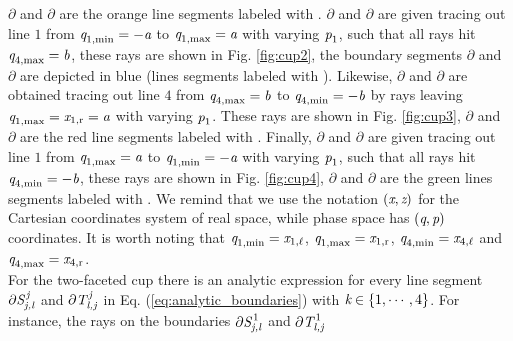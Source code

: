  $\partial$ and $\partial$ are the orange line segments labeled with . 
 $\partial$ and $\partial$ are given tracing out line $1$ from
 $\textit{q}_{1, \textrm{min}}= -\textit{a}$ to $\textit{q}_{1, \textrm{max}}= \textit{a}$
 with varying $\textit{p}_1$, such that all rays hit $\textit{q}_{4, \textrm{max}} = \textit{b}$, these rays are shown in Fig. \ref{fig:cup2}, the boundary segments
 $\partial$ and $\partial$ are depicted in blue (lines segments labeled with ).
 Likewise, $\partial$ and $\partial$ are obtained tracing out line $4$ from
$\textit{q}_{4, \textrm{max}}= \textit{b}$ to $\textit{q}_{4, \textrm{min}}= -\textit{b}$ 
 by rays leaving $\textit{q}_{1, \textrm{max}}=\textit{x}_{1, \textrm{r}} = \textit{a}$ with varying $\textit{p}_{1}$. These rays are shown in Fig. \ref{fig:cup3}, 
 $\partial$ and $\partial$ are the red line segments labeled with .
  Finally, $\partial$ and $\partial$ are given tracing out line $1$ from
$\textit{q}_{1, \textrm{max}} = \textit{a}$ to  $\textit{q}_{1, \textrm{min}} = -\textit{a}$ 
 with varying $\textit{p}_{1}$, such that all rays hit $\textit{q}_{4, \textrm{min}} = -\textit{b}$, these rays are shown in Fig. \ref{fig:cup4}, 
 $\partial$ and $\partial$ are the green lines segments labeled with . 
We remind that we use the notation $(\textit{x}, \textit{z})$ for the Cartesian coordinates system of real space, while phase space has $(\textit{q}, \textit{p})$ coordinates. 
It is worth noting that  $\textit{q}_{1, \textrm{min}}=\textit{x}_{1, \ell}$,  $\textit{q}_{1, \textrm{max}}=\textit{x}_{1, \textrm{r}}$,  
$\textit{q}_{4, \textrm{min}}=\textit{x}_{4, \ell}$ and  $\textit{q}_{4, \textrm{max}}=\textit{x}_{4, \textrm{r}}$.\\ \indent
 For the two-faceted cup there is an analytic expression for every line segment $\partial\mbox{$\emph{S}_{\textit{\textit{j},\textit{l}}}^{\textit{\,j}}$}$ and
 $\partial\mbox{$\emph{T}_{\textit{\textit{l},\textit{j}}}^{\textit{\,j}}$}$ in Eq. (\ref{eq:analytic_boundaries}) with $\textit{\textit{k}}\in\{1, \cdots, 4\}$.
 For instance, the rays on the boundaries $\partial\mbox{$\emph{S}_{\textit{\textit{j},\textit{l}}}^{\,1}$}$ and $\partial \mbox{$\emph{T}_{\textit{\textit{l},\textit{j}}}^{\,1}$}$

